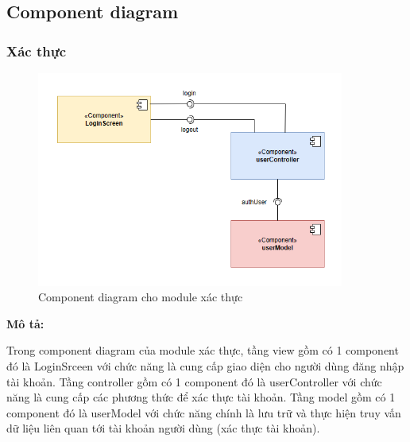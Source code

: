 \subsection{Component diagram}
\subsubsection{Xác thực}
\begin{figure}[H]
    \begin{center}
        \includegraphics[width=0.9\textwidth]{Images/Architecture Design/Authen_Component.png}
        \caption{Component diagram cho module xác thực}
    \end{center}
\end{figure}
\textbf{Mô tả:}\par
Trong component diagram của module xác thực, tầng view gồm có 1 component đó là LoginSrceen với chức năng là cung cấp giao diện cho người dùng đăng nhập tài khoản. Tầng controller gồm có 1 component đó là userController với chức năng là cung cấp các phương thức để xác thực tài khoản. Tầng model gồm có 1 component đó là userModel với chức năng chính là lưu trữ và thực hiện truy vấn dữ liệu liên quan tới tài khoản người dùng (xác thực tài khoản).

